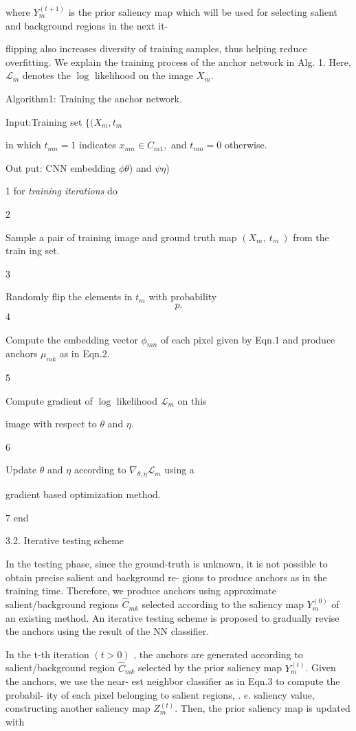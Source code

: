 \documentclass[a4paper,10pt]{article}
\begin{document}
where $Y_{m}^{(t+1)}$ is the prior saliency map which will be used for selecting salient and background regions in the next it-

flipping also increases diversity of training samples, thus helping reduce overfitting. We explain the training process of the anchor network in Alg. 1. Here, $\mathcal{L}_{m}$ denotes the $\log$ likelihood on the image $X_{m}.$

Algorithm1: Training the anchor network.

Input:Training set $\{(X_{m}, t_{m}$

in which $t_{mn}=1$ indicates $x_{mn}\in C_{m1},$ and $t_{mn}=0$ otherwise.

Out put: CN$\mathrm{N}$ embedding $\phi \theta$) and $\psi \eta$)

1 for {\it training iterations} do

2

Sample a pair of training image and ground truth map $(X_{m},\ t_{m}\ )$ from the train ing set.

3

Randomly flip the elements in $t_{m}$ with probability
$$
p.
$$
4

Compute the embedding vector $\phi_{mn}$ of each pixel given by Eqn.1 and produce anchors $\mu_{mk}$ as in Eqn.2.

5

Compute gradient of $\log$ likelihood $\mathcal{L}_{m}$ on this

image with respect to $\theta$ and $\eta.$

6

Update $\theta$ and $\eta$ according to $\nabla_{\theta,\eta}\mathcal{L}_{m}$ using a

gradient based optimization method.

7 end

3.2. Iterative testing scheme

In the testing phase, since the ground-truth is unknown, it is not possible to obtain precise salient and background re- gions to produce anchors as in the training time. Therefore, we produce anchors using approximate salient/background regions $\hat{C}_{mk}$ selected according to the saliency map $Y_{m}^{(0)}$ of an existing method. An iterative testing scheme is proposed to gradually revise the anchors using the result of the NN classifier.

In the t-th iteration $(t>0)$ , the anchors are generated according to salient/background region $\hat{C}_{mk}$ selected by the prior saliency map $Y_{m}^{(t)}$. Given the anchors, we use the near- est neighbor classifier as in Eqn.3 to compute the probabil- ity of each pixel belonging to salient regions, . $e$. saliency value, constructing another saliency map $Z_{m}^{(t)}$. Then, the prior saliency map is updated with
\end{document}
